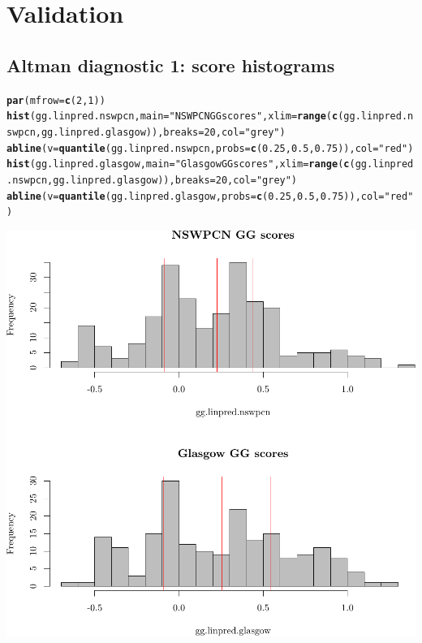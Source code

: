 \documentclass{article}\usepackage[]{graphicx}\usepackage[]{color}
\makeatletter
\def\maxwidth{ %
  \ifdim\Gin@nat@width>\linewidth
    \linewidth
  \else
    \Gin@nat@width
  \fi
}
\newcommand{\hlnum}[1]{\textcolor[rgb]{0.686,0.059,0.569}{#1}}%
\newcommand{\hlstr}[1]{\textcolor[rgb]{0.192,0.494,0.8}{#1}}%
\newcommand{\hlstd}[1]{\textcolor[rgb]{0.345,0.345,0.345}{#1}}%
\newcommand{\hlkwc}[1]{\textcolor[rgb]{0.333,0.667,0.333}{#1}}%
\newcommand{\hlkwd}[1]{\textcolor[rgb]{0.737,0.353,0.396}{\textbf{#1}}}%
\newenvironment{kframe}{%
 \def\at@end@of@kframe{}%
 \ifinner\ifhmode%
  \def\at@end@of@kframe{\end{minipage}}%
  \begin{minipage}{\columnwidth}%
 \fi\fi%
 \def\FrameCommand##1{\hskip\@totalleftmargin \hskip-\fboxsep
 \colorbox{shadecolor}{##1}\hskip-\fboxsep
     \hskip-\linewidth \hskip-\@totalleftmargin \hskip\columnwidth}%
 \MakeFramed {\advance\hsize-\width
   \@totalleftmargin\z@ \linewidth\hsize
   \@setminipage}}%
 {\par\unskip\endMakeFramed%
 \at@end@of@kframe}
\newenvironment{knitrout}{}{} %
\makeatother
\begin{document}
\section{Validation}
\subsection{Altman diagnostic 1: score histograms}
\begin{knitrout}
\color{fgcolor}\begin{kframe}
\begin{alltt}
\hlkwd{par}\hlstd{(}\hlkwc{mfrow} \hlstd{=} \hlkwd{c}\hlstd{(}\hlnum{2}\hlstd{,} \hlnum{1}\hlstd{))}
\hlkwd{hist}\hlstd{(gg.linpred.nswpcn,} \hlkwc{main} \hlstd{=} \hlstr{"NSWPCN GG scores"}\hlstd{,} \hlkwc{xlim} \hlstd{=} \hlkwd{range}\hlstd{(}\hlkwd{c}\hlstd{(gg.linpred.nswpcn, gg.linpred.glasgow)),} \hlkwc{breaks} \hlstd{=} \hlnum{20}\hlstd{,} \hlkwc{col} \hlstd{=} \hlstr{"grey"}\hlstd{)}
\hlkwd{abline}\hlstd{(}\hlkwc{v} \hlstd{=} \hlkwd{quantile}\hlstd{(gg.linpred.nswpcn,} \hlkwc{probs} \hlstd{=} \hlkwd{c}\hlstd{(}\hlnum{0.25}\hlstd{,} \hlnum{0.5}\hlstd{,} \hlnum{0.75}\hlstd{)),} \hlkwc{col} \hlstd{=} \hlstr{"red"}\hlstd{)}
\hlkwd{hist}\hlstd{(gg.linpred.glasgow,} \hlkwc{main} \hlstd{=} \hlstr{"Glasgow GG scores"}\hlstd{,} \hlkwc{xlim} \hlstd{=} \hlkwd{range}\hlstd{(}\hlkwd{c}\hlstd{(gg.linpred.nswpcn, gg.linpred.glasgow)),} \hlkwc{breaks} \hlstd{=} \hlnum{20}\hlstd{,} \hlkwc{col} \hlstd{=} \hlstr{"grey"}\hlstd{)}
\hlkwd{abline}\hlstd{(}\hlkwc{v} \hlstd{=} \hlkwd{quantile}\hlstd{(gg.linpred.glasgow,} \hlkwc{probs} \hlstd{=} \hlkwd{c}\hlstd{(}\hlnum{0.25}\hlstd{,} \hlnum{0.5}\hlstd{,} \hlnum{0.75}\hlstd{)),} \hlkwc{col} \hlstd{=} \hlstr{"red"}\hlstd{)}
\end{alltt}
\end{kframe}

{\centering \includegraphics[width=\maxwidth]{figure/05-score-hists-1} 

}
\end{knitrout}
\end{document}
